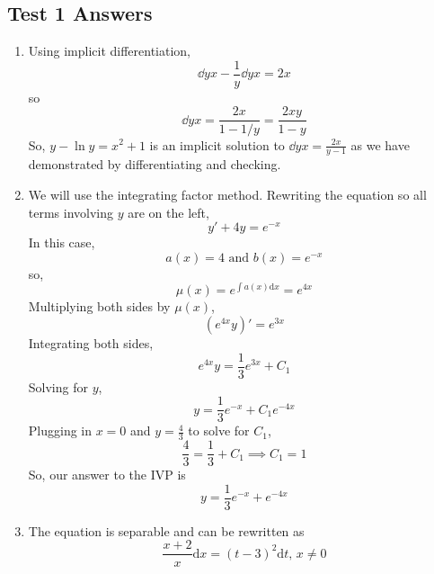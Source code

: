 \subsection{Test 1 Answers}
\begin{enumerate}[label=\arabic*.]
	\item 
		Using implicit differentiation,
		\begin{equation*}
			\dd{y}{x}-\frac{1}{y}\dd{y}{x} = 2x
		\end{equation*}
		so
		\begin{equation*}
			\dd{y}{x} = \frac{2x}{1-1/y} = \frac{2xy}{1-y}
		\end{equation*}
		So, $y - \ln{y} = x^2 + 1$ is an implicit solution to $\dd{y}{x} = \frac{2x}{y-1}$ as we have demonstrated by differentiating and checking.
	\item
		We will use the integrating factor method. Rewriting the equation so all terms involving $y$ are on the left,
		\begin{equation*}
			y' + 4y = e^{-x}
		\end{equation*}
		In this case,
		\begin{equation*}
			a(x) = 4 \text{ and } b(x) = e^{-x}
		\end{equation*}
		so,
		\begin{equation*}
			\mu(x) = e^{\int{a(x) \mathrm{d}x}} = e^{4x}
		\end{equation*}
		Multiplying both sides by $\mu(x)$,
		\begin{equation*}
			\left(e^{4x}y\right)' = e^{3x}
		\end{equation*}
		Integrating both sides,
		\begin{equation*}
			e^{4x}y = \frac{1}{3}e^{3x} + C_1
		\end{equation*}
		Solving for $y$,
		\begin{equation*}
			y = \frac{1}{3}e^{-x} + C_1e^{-4x}
		\end{equation*}
		Plugging in $x = 0$ and $y=\frac{4}{3}$ to solve for $C_1$,
		\begin{equation*}
			\frac{4}{3} = \frac{1}{3} + C_1 \implies C_1 = 1
		\end{equation*}
		So, our answer to the IVP is
		\begin{equation*}
			y = \frac{1}{3}e^{-x} + e^{-4x}
		\end{equation*}
	\item
		The equation is separable and can be rewritten as
		\begin{equation*}
			\frac{x+2}{x} \mathrm{d}x = (t-3)^2 \mathrm{d}t \text{, } x\neq 0

\end{equation*}
\end{enumerate}
